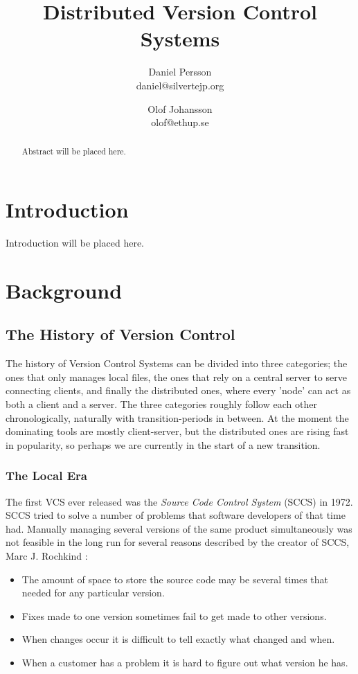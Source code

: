 \documentclass{article}
\title{Distributed Version Control Systems}
\author {
 Daniel Persson \\\small daniel@silvertejp.org \and
 Olof Johansson \\\small olof@ethup.se
}
\begin{document}
\maketitle

\begin{abstract}
 Abstract will be placed here.
\end{abstract}


\section{Introduction}
Introduction will be placed here.
\section{Background}

\subsection{The History of Version Control}
The history of Version Control Systems can be divided into three
categories; the ones that only manages local files, the ones that rely
on a central server to serve connecting clients, and finally the
distributed ones, where every 'node' can act as both a client and a
server. The three categories roughly follow each other
chronologically, naturally with transition-periods in between. At the
moment the dominating tools are mostly client-server, but the
distributed ones are rising fast in popularity, so perhaps we are
currently in the start of a new transition.

\subsubsection{The Local Era}
The first VCS ever released was the \emph{Source Code Control System}
(SCCS) in 1972. SCCS tried to solve a number of problems that software
developers of that time had. Manually managing several versions of the
same product simultaneously was not feasible in the long run for
several reasons described by the creator of SCCS, Marc J. Rochkind
\cite{rochkind75}:

\begin{itemize}
 \item The amount of space to store the source code may be several
       times that needed for any particular version.
 \item Fixes made to one version sometimes fail to get made to
       other versions.
 \item When changes occur it is difficult to tell exactly what changed
       and when.
 \item When a customer has a problem it is hard to figure out what
       version he has.
\end{itemize}
\end{document}
